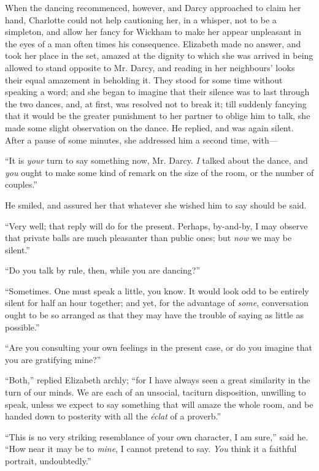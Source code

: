 When the dancing recommenced, however, and Darcy approached to claim her hand, Charlotte could not help cautioning her, in a whisper, not to be a simpleton, and allow her fancy for Wickham to make her appear unpleasant in the eyes of a man often times his consequence. Elizabeth made no answer, and took her place in the set, amazed at the dignity to which she was arrived in being allowed to stand opposite to Mr. Darcy, and reading in her neighbours' looks their equal amazement in beholding it. They stood for some time without speaking a word; and she began to imagine that their silence was to last through the two dances, and, at first, was resolved not to break it; till suddenly fancying that it would be the greater punishment to her partner to oblige him to talk, she made some slight observation on the dance. He replied, and was again silent. After a pause of some minutes, she addressed him a second time, with---

``It is \textit{your} turn to say something now, Mr. Darcy. \textit{I} talked about the dance, and \textit{you} ought to make some kind of remark on the size of the room, or the number of couples.''

He smiled, and assured her that whatever she wished him to say should be said.

``Very well; that reply will do for the present. Perhaps, by-and-by, I may observe that private balls are much pleasanter than public ones; but \textit{now} we may be silent.''

``Do you talk by rule, then, while you are dancing?''

``Sometimes. One must speak a little, you know. It would look odd to be entirely silent for half an hour together; and yet, for the advantage of \textit{some}, conversation ought to be so arranged as that they may have the trouble of saying as little as possible.''

``Are you consulting your own feelings in the present case, or do you imagine that you are gratifying mine?''

``Both,'' replied Elizabeth archly; ``for I have always seen a great similarity in the turn of our minds. We are each of an unsocial, taciturn disposition, unwilling to speak, unless we expect to say something that will amaze the whole room, and be handed down to posterity with all the \textit{éclat} of a proverb.''

``This is no very striking resemblance of your own character, I am sure,'' said he. ``How near it may be to \textit{mine}, I cannot pretend to say. \textit{You} think it a faithful portrait, undoubtedly.''

